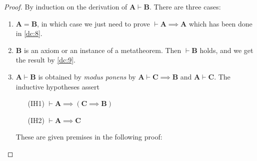 \documentclass{amsart}%
\newcommand\metavariable[1]{\boldsymbol{#1}}
\begin{document}
\begin{proof}
By induction on the derivation of
$\metavariable{A}\vdash\metavariable{B}$. There are three cases:
\begin{enumerate}
\item $\metavariable{A}=\metavariable{B}$, in which case we just need to
  prove $\vdash\metavariable{A}\implies\metavariable{A}$ which has been
  done in \ref{dc:8}.
\item $\metavariable{B}$ is an axiom or an instance of a
  metatheorem. Then $\vdash\metavariable{B}$ holds, and we get the
  result by \ref{dc:9}.
\item $\metavariable{A}\vdash\metavariable{B}$ is obtained by
  \textit{modus ponens} by $\metavariable{A}\vdash\metavariable{C}\implies\metavariable{B}$
  and $\metavariable{A}\vdash\metavariable{C}$. The inductive hypotheses
  assert
  \begin{itemize}
  \item[(IH1)] $\vdash\metavariable{A}\implies(\metavariable{C}\implies\metavariable{B})$
  \item[(IH2)] $\vdash\metavariable{A}\implies\metavariable{C}$
  \end{itemize}
  These are given premises in the following proof:
\end{enumerate}
\end{proof}
\end{document}
